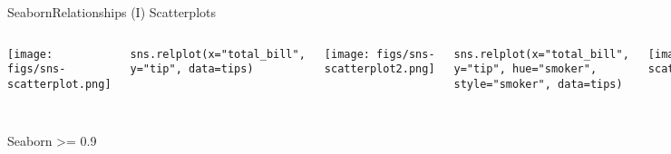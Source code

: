 \documentclass[10pt,compress]{beamer} %
\begin{document}
\begin{frame}[fragile]{Seaborn}{Relationships (I)}
	\centering Scatterplots

	\begin{columns}[t]
	\texttt{[image: figs/sns-scatterplot.png]}\\
	\begin{exampleblock}{}
	\vspace{-0.2cm} 
	\begin{lstlisting}[basicstyle=\tiny]
	sns.relplot(x="total_bill", y="tip", data=tips)
	\end{lstlisting}
	\vspace{-0.2cm} 
	\end{exampleblock}

	\texttt{[image: figs/sns-scatterplot2.png]}\\
	\begin{exampleblock}{}
	\vspace{-0.2cm} 
	\begin{lstlisting}[basicstyle=\tiny]
	sns.relplot(x="total_bill", y="tip", hue="smoker", style="smoker", data=tips)
	\end{lstlisting}
	\vspace{-0.2cm} 
	\end{exampleblock}

	\texttt{[image: figs/sns-scatterplot3.png]}\\
	\begin{exampleblock}{}
	\vspace{-0.2cm} 
	\begin{lstlisting}[basicstyle=\tiny]
	sns.relplot(x="total_bill", y="tip", size="size", sizes=(15, 200), data=tips);
	\end{lstlisting}
	\vspace{-0.2cm} 
	\end{exampleblock}

	\end{columns}

	Seaborn >= 0.9
\end{frame}
\end{document}
